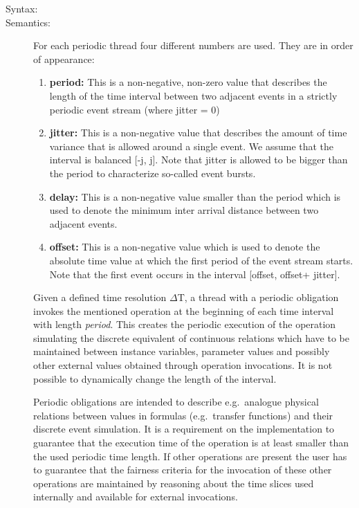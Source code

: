 \documentclass[\pformat,12pt]{article}
\begin{document}
\begin{description}
\item[Syntax:] 

\item[Semantics:] 
For each periodic thread four different numbers are used. They are in order 
of appearance: 

\begin{enumerate}
\item \textbf{period:} This is a non-negative, non-zero value that describes the length of the 
time interval between two adjacent events in a strictly periodic event stream (where jitter = 0)
\item \textbf{jitter:} This is a non-negative value that describes the amount of time variance that is allowed
around a single event. We assume that the interval is balanced [-j, j]. Note that jitter is
allowed to be bigger than the period to characterize so-called event bursts.
\item \textbf{delay:} This is a non-negative value smaller than the period which is used to denote the minimum
inter arrival distance between two adjacent events.
\item \textbf{offset:} This is a non-negative value which is used to denote the absolute time value at which
the first period of the event stream starts. Note that the first event occurs in the interval
[offset, offset+ jitter].
\end{enumerate}

Given a defined time resolution $\Delta$T, a thread with a periodic
obligation invokes the mentioned operation at the beginning of each
time interval with length {\em period}.  This creates the periodic
execution of the operation simulating the discrete equivalent of
continuous relations which have to be maintained between instance
variables, parameter values and possibly other external values
obtained through operation invocations.  It is not possible to dynamically 
change the length of the interval.

Periodic obligations are intended to describe e.g.\
analogue physical relations between values in formulas (e.g.\ transfer
functions) and their discrete event simulation.
It is a requirement on the implementation to
guarantee that the execution time of the operation is at least smaller
than the used periodic time length.
If other operations are present the user has to guarantee that
the fairness criteria for the invocation of these other operations are
maintained by reasoning about the time slices used internally and
available for external invocations.


\end{description}
\end{document}
